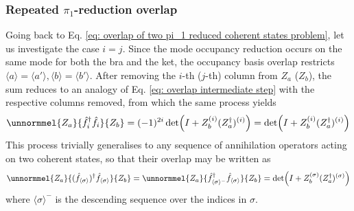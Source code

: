 \documentclass[12pt]{article}
\newcommand{\seq}[1]{\langle #1\rangle}
\newcommand{\hc}{^\dagger}
\begin{document}
	\subsubsection{Repeated $\pi_1$-reduction overlap}
	Going back to Eq. \ref{eq: overlap of two pi_1 reduced coherent states problem}, let us investigate the case $i=j$. Since the mode occupancy reduction occurs on the same mode for both the bra and the ket, the occupancy basis overlap restricts $\seq{a}=\seq{a'}, \seq{b}=\seq{b'}$. After removing the $i$-th ($j$-th) column from $Z_a$ ($Z_b$), the sum reduces to an analogy of Eq. \ref{eq: overlap intermediate step} with the respective columns removed, from which the same process yields
	\begin{equation}
	\unnormmel{Z_a}{\hat{f}\hc_i\hat{f}_i}{Z_b}=(-1)^{2i}\det(I+Z_b^{(i)}(Z_a\hc)^{(i)})=\det(I+Z_b^{(i)}(Z_a\hc)^{(i)})
	\end{equation}
	This process trivially generalises to any sequence of annihilation operators acting on two coherent states, so that their overlap may be written as
	\begin{equation} \label{eq:repeated pi_1 reduction}
	\unnormmel{Z_a}{(\hat{f}_{\seq{\sigma}})\hc\hat{f}_{\seq{\sigma}}}{Z_b}=\unnormmel{Z_a}{\hat{f}\hc_{\seq{\sigma}^-}\hat{f}_{\seq{\sigma}}}{Z_b}=\det(I+Z_b^{(\sigma)}(Z_a\hc)^{(\sigma)})
	\end{equation}
	where $\seq{\sigma}^-$ is the descending sequence over the indices in $\sigma$.
	
\end{document}
